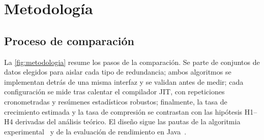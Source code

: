\section{Metodología}
\label{sec:metodologia}

\subsection{Proceso de comparación}
\label{sec:proceso}
La \cref{fig:metodologia} resume los pasos de la comparación. Se parte de conjuntos de datos
elegidos para aislar cada tipo de redundancia; ambos algoritmos se implementan detrás de una
misma interfaz y se validan antes de medir; cada configuración se mide tras calentar el
compilador JIT, con repeticiones cronometradas y resúmenes estadísticos robustos; finalmente,
la tasa de crecimiento estimada y la tasa de compresión se contrastan con las hipótesis
H1--H4 derivadas del análisis teórico. El diseño sigue las pautas de la algoritmia
experimental~\cite{johnson2002,mcgeoch2012} y de la evaluación de rendimiento en
Java~\cite{georges2007}.

